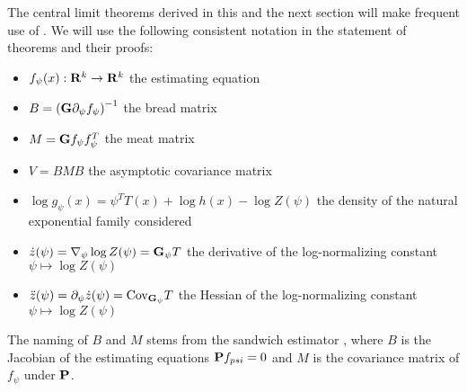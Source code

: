 \begin{notation}
    \label{not:notation-clt}
    The central limit theorems derived in this and the next section will make frequent use of . We will use the following consistent notation in the statement of theorems and their proofs:
    \begin{itemize}
        \item $f_\psi(x): \R^{k} \to \R^{k}$ the estimating equation              
        \item $B = \left(\G\partial_{\psi} f_{\psi}\right)^{-1}$ the bread matrix
        \item $M = \G f_{\psi}f_{\psi}^{T}$ the meat matrix
        \item $V = BMB$ the asymptotic covariance matrix
        \item $\log g_{\psi}(x) = \psi^{T}T(x) + \log h(x) - \log Z(\psi)$ the density of the natural exponential family considered
        \item $\dot z (\psi) = \nabla_{\psi}\log Z(\psi) = \G_{\psi} T$ the derivative of the log-normalizing constant $\psi \mapsto \log Z(\psi)$
        \item $\ddot z(\psi) = \partial_{\psi} \dot z(\psi) =\cov_{\G_{\psi}}T$ the Hessian of the log-normalizing constant $\psi \mapsto \log Z(\psi)$
    \end{itemize}
    The naming of $B$ and $M$ stems from the sandwich estimator , where $B$ is the Jacobian of the estimating equations $\P f_{psi} = 0$ and $M$ is the covariance matrix of $f_{\psi}$ under $\P$. 
\end{notation}

\begin{theorem}
    \label{thm:ce-consistent}
\end{theorem}

